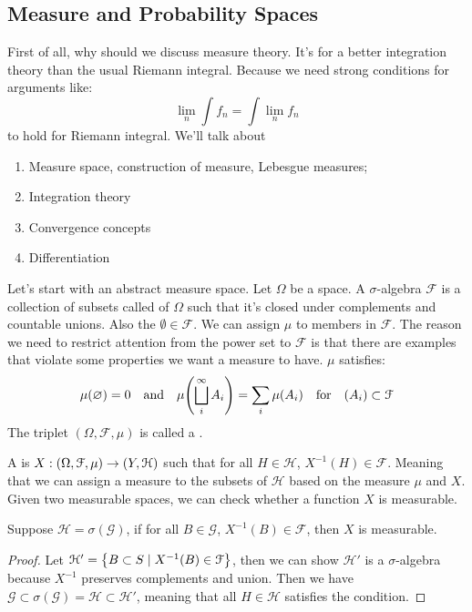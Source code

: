 \subsection{Measure and Probability Spaces}
First of all, why should we discuss measure theory. It's for a better integration theory than the usual Riemann integral. Because we need strong conditions for arguments like:
\begin{equation*}
    \lim_{n} \int f_{n} = \int \lim_{n} f_{n}
\end{equation*}
to hold for Riemann integral.  We'll talk about
\begin{enumerate}
    \item Measure space, construction of measure, Lebesgue measures;
    \item Integration theory
    \item Convergence concepts 
    \item Differentiation 
\end{enumerate}

Let's start with an abstract measure space. Let \(\Omega\) be a space. A \(\sigma\)-algebra \(\mathcal{F}\) is a collection of subsets called  of \(\Omega\) such that it's closed under complements and countable unions. Also the \(\emptyset \in \mathcal{F}\). We can assign  \(\mu\) to members in \(\mathcal{F}\). The reason we need to restrict attention from the power set to \(\mathcal{F}\) is that there are examples that violate some properties we want a measure to have. \(\mu\) satisfies:
\begin{equation*}
    \mu\pqty{\emptyset} = 0 \qq{and} \mu \pqty{\sqcup_{i}^{\infty} A_{i}} = \sum_{i} \mu(A_{i}) \qq{for} (A_{i}) \subset \mathcal{F}
\end{equation*}
The triplet \((\Omega, \mathcal{F}, \mu)\) is called a .  

A  is \(X : (\Omega, \mathcal{F}, \mu) \to \pqty{Y, \mathcal{H}}\) such that for all \(H \in \mathcal{H}\), \(X^{-1}(H) \in \mathcal{F}\). Meaning that we can assign a measure to the subsets of \(\mathcal{H}\) based on the measure \(\mu\) and \(X\). 
Given two measurable spaces, we can check whether a function \(X\) is measurable. 

\begin{lemma}
    Suppose \(\mathcal{H} = \sigma(\mathcal{G})\), if for all \(B \in \mathcal{G}\), \(X^{-1} (B) \in \mathcal{F}\), then \(X \) is measurable. 
\end{lemma}
\begin{proof}
    Let \(\mathcal{H}' = \Bqty{B\subset S\mid X^{-1}(B) \in \mathcal{F}}\), then we can show \(\mathcal{H}'\) is a \(\sigma\)-algebra because \(X^{-1}\) preserves complements and union. Then we have \(\mathcal{G} \subset \sigma(\mathcal{G}) = \mathcal{H} \subset \mathcal{H}'\), meaning that all \(H\in \mathcal{H}\) satisfies the condition.
\end{proof}

